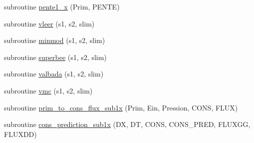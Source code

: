 \begin{DoxyCompactItemize}
\item 
subroutine \mbox{\hyperlink{main1DOr2_8f90_ab1369821f897b816d4e9a8f6740ea693}{pente1\+\_\+x}} (Prim, P\+E\+N\+TE)
\item 
subroutine \mbox{\hyperlink{main1DOr2_8f90_af50a25d9d5f073c1347e643d589770ac}{vleer}} (s1, s2, slim)
\item 
subroutine \mbox{\hyperlink{main1DOr2_8f90_a782814db45b1ac79c2d169964b28fd07}{minmod}} (s1, s2, slim)
\item 
subroutine \mbox{\hyperlink{main1DOr2_8f90_a1584e44687072629ab256df4b8fe6537}{superbee}} (s1, s2, slim)
\item 
subroutine \mbox{\hyperlink{main1DOr2_8f90_ac6b2b51b381114cb3bc7fa9abc69dee7}{valbada}} (s1, s2, slim)
\item 
subroutine \mbox{\hyperlink{main1DOr2_8f90_a236c2f231e6eabfc3ddff4bc2f56bb99}{vmc}} (s1, s2, slim)
\item 
subroutine \mbox{\hyperlink{main1DOr2_8f90_a1054c20993438d4f9ef5cc742a3245b4}{prim\+\_\+to\+\_\+cons\+\_\+flux\+\_\+sub1x}} (Prim, Ein, Pression, C\+O\+NS, F\+L\+UX)
\item 
subroutine \mbox{\hyperlink{main1DOr2_8f90_a41f5497b85eecbbc6af40d3959e67a3d}{cons\+\_\+prediction\+\_\+sub1x}} (DX, DT, C\+O\+NS, C\+O\+N\+S\+\_\+\+P\+R\+ED, F\+L\+U\+X\+GG, F\+L\+U\+X\+DD)
\end{DoxyCompactItemize}
